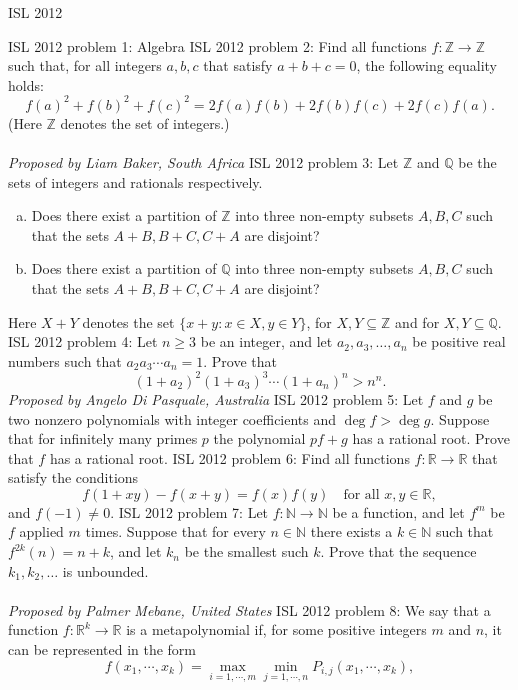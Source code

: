 ISL 2012 

ISL 2012 problem 1:  Algebra 
ISL 2012 problem 2:  Find all functions $f:\mathbb Z\rightarrow \mathbb Z$ such that, for all integers $a,b,c$ that satisfy $a+b+c=0$, the following equality holds:
\[ f(a)^2+f(b)^2+f(c)^2=2f(a)f(b)+2f(b)f(c)+2f(c)f(a). \]
(Here $\mathbb{Z}$ denotes the set of integers.) \\\\
\textit{Proposed by Liam Baker, South Africa} 
ISL 2012 problem 3:  Let $\mathbb{Z}$ and $\mathbb{Q}$ be the sets of integers and rationals respectively.
\begin{enumerate}[a)]
  \item Does there exist a partition of $\mathbb{Z}$ into three non-empty subsets $A,B,C$ such that the sets $A+B, B+C, C+A$ are disjoint?
  \item Does there exist a partition of $\mathbb{Q}$ into three non-empty subsets $A,B,C$ such that the sets $A+B, B+C, C+A$ are disjoint?
\end{enumerate}
Here $X+Y$ denotes the set $\{ x+y : x \in X, y \in Y \}$, for $X,Y \subseteq \mathbb{Z}$ and  for $X,Y \subseteq \mathbb{Q}$. 
ISL 2012 problem 4:  Let $n\ge 3$ be an integer, and let $a_2,a_3,\ldots ,a_n$ be positive real numbers such that $a_2a_3\cdots a_n=1$. Prove that
\[ (1 + a_2)^2 (1 + a_3)^3 \dotsm (1 + a_n)^n > n^n. \]
\textit{Proposed by Angelo Di Pasquale, Australia} 
ISL 2012 problem 5:  Let $f$ and $g$ be two nonzero polynomials with integer coefficients and $\deg f>\deg g$.  Suppose that for infinitely many primes $p$ the polynomial $pf+g$ has a rational root. Prove that $f$ has a rational root. 
ISL 2012 problem 6:  Find all functions $f:\mathbb{R} \rightarrow \mathbb{R}$ that satisfy the conditions
\[ f(1+xy)-f(x+y)=f(x)f(y) \quad \text{for all } x,y \in \mathbb{R}, \]
and $f(-1) \neq 0$. 
ISL 2012 problem 7:  Let $f: \mathbb{N} \rightarrow \mathbb{N}$ be a function, and let $f^m$ be $f$ applied $m$ times. Suppose that for every $n \in \mathbb{N}$ there exists a $k \in \mathbb{N}$ such that $f^{2k}(n)=n+k$, and let $k_n$ be the smallest such $k$. Prove that the sequence $k_1,k_2,\ldots $ is unbounded. \\\\
\textit{Proposed by Palmer Mebane, United States} 
ISL 2012 problem 8:  We say that a function $f:\mathbb{R}^k \rightarrow \mathbb{R}$ is a metapolynomial if, for some positive integers $m$ and $n$, it can be represented in the form
\[ f(x_1,\cdots , x_k )=\max_{i=1,\cdots , m} \min_{j=1,\cdots , n}P_{i,j}(x_1,\cdots , x_k), \]
